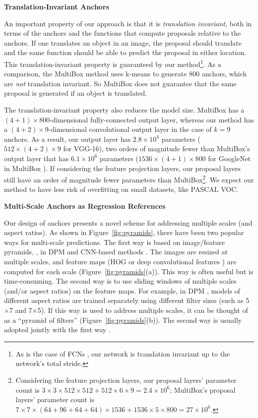 \documentclass[10pt,journal,cspaper,compsoc]{IEEEtran}
\begin{document}
\vspace{.5em}
\noindent\textbf{Translation-Invariant Anchors}

An important property of our approach is that it is \emph{translation invariant}, both in terms of the anchors and the functions that compute proposals relative to the anchors.
If one translates an object in an image, the proposal should translate and the same function should be able to predict the proposal in either location. This translation-invariant property is guaranteed by our method\footnote{As is the case of FCNs \cite{Long2015}, our network is translation invariant up to the network's total stride.}.
As a comparison, the MultiBox method \cite{Szegedy2014a} uses k-means to generate 800 anchors, which are \emph{not} translation invariant. So MultiBox does not guarantee that the same proposal is generated if an object is translated.

The translation-invariant property also reduces the model size.
MultiBox has a $(4+1)\times800$-dimensional fully-connected output layer, whereas our method has a $(4+2)\times9$-dimensional convolutional output layer in the case of $k=9$ anchors. As a result, our output layer has $2.8\times10^4$ parameters ($512\times(4+2)\times9$ for VGG-16), two orders of magnitude fewer than MultiBox's output layer that has $6.1\times10^6$ parameters ($1536\times(4+1)\times800$ for GoogleNet \cite{Szegedy2015} in MultiBox \cite{Szegedy2014a}).
If considering the feature projection layers, our proposal layers still have an order of magnitude fewer parameters than MultiBox\footnote{Considering the feature projection layers, our proposal layers' parameter count is $3\times3\times512\times512+512\times6\times9=2.4\times10^6$; MultiBox's proposal layers' parameter count is $7\times7\times(64+96+64+64)\times1536+1536\times5\times800=27\times10^6$.}. We expect our method to have less risk of overfitting on small datasets, like PASCAL VOC.


\vspace{.5em}
\noindent\textbf{Multi-Scale Anchors as Regression References}

Our design of anchors presents a novel scheme for addressing multiple scales (and aspect ratios).
As shown in Figure~\ref{fig:pyramids}, there have been two popular ways for multi-scale predictions. The first way is based on image/feature pyramids, \eg, in DPM \cite{Felzenszwalb2010} and CNN-based methods \cite{Sermanet2014,He2014,Girshick2015a}. The images are resized at multiple scales, and feature maps (HOG \cite{Felzenszwalb2010} or deep convolutional features \cite{Sermanet2014,He2014,Girshick2015a}) are computed for each scale (Figure~\ref{fig:pyramids}(a)). This way is often useful but is time-consuming. The second way is to use sliding windows of multiple scales (and/or aspect ratios) on the feature maps. For example, in DPM \cite{Felzenszwalb2010}, models of different aspect ratios are trained separately using different filter sizes (such as 5$\times$7 and 7$\times$5). If this way is used to address multiple scales, it can be thought of as a ``pyramid of filters'' (Figure~\ref{fig:pyramids}(b)). The second way is usually adopted jointly with the first way \cite{Felzenszwalb2010}.
\end{document}
